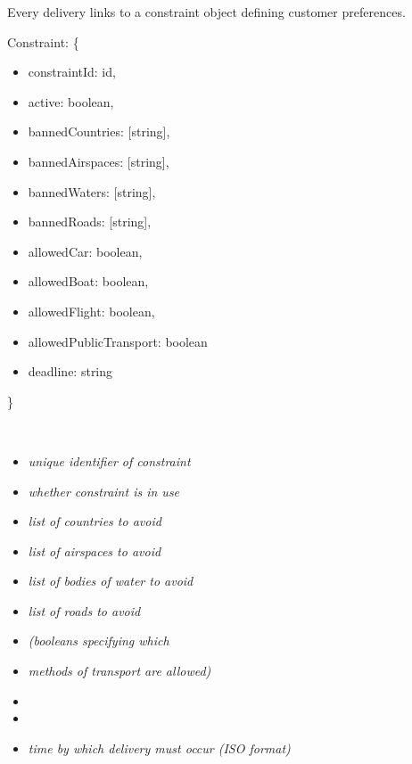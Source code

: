 \begin{flushleft}
Every delivery links to a constraint object defining customer preferences.
\end{flushleft}
\begin{minipage}{7cm}
    Constraint: \{ 
    \begin{itemize}
        \itemsep-0.5em
        \item[] constraintId: id,
        \item[] active: boolean,
        \item[] bannedCountries: [string],
        \item[] bannedAirspaces: [string],
        \item[] bannedWaters: [string],
        \item[] bannedRoads: [string],
        \item[] allowedCar: boolean,
        \item[] allowedBoat: boolean,
        \item[] allowedFlight: boolean,
        \item[] allowedPublicTransport: boolean
        \item[] deadline: string
    \end{itemize}
    \}
\end{minipage}
\begin{minipage}{10cm}
    \hspace{1cm} \\
    \begin{itemize}
        \itemsep-0.5em
        \item[] \textit{unique identifier of constraint}
        \item[] \textit{whether constraint is in use}
        \item[] \textit{list of countries to avoid}
        \item[] \textit{list of airspaces to avoid}
        \item[] \textit{list of bodies of water to avoid}
        \item[] \textit{list of roads to avoid}
        \item[] \textit{(booleans specifying  which}
        \item[] \textit{methods of transport are allowed)}
        \item[] \hspace{1cm}
        \item[] \hspace{1cm}
        \item[] \textit{time by which delivery must occur (ISO format)}
    \end{itemize}
    \hspace{1cm} \\
\end{minipage}
